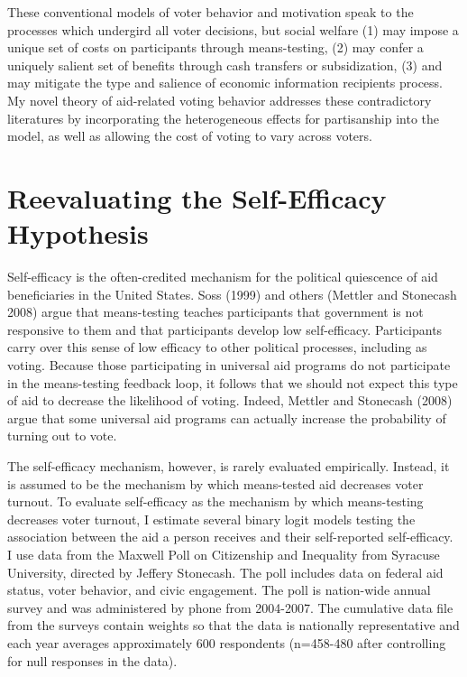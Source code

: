 \documentclass[12pt]{paper}
\begin{document}
These conventional models of voter behavior and motivation speak to the processes which undergird all voter decisions, but social welfare (1) may impose a unique set of costs on participants through means-testing, (2) may confer a uniquely salient set of benefits through cash transfers or subsidization, (3) and may mitigate the type and salience of economic information recipients process. My novel theory of aid-related voting behavior addresses these contradictory literatures by incorporating the heterogeneous effects for partisanship into the model, as well as allowing the cost of voting to vary across voters.

\section{Reevaluating the Self-Efficacy Hypothesis}
Self-efficacy is the often-credited mechanism for the political quiescence of aid beneficiaries in the United States. Soss (1999) and others (Mettler and Stonecash 2008) argue that means-testing teaches participants that government is not responsive to them and that participants develop low self-efficacy. Participants carry over this sense of low efficacy to other political processes, including as voting. Because those participating in universal aid programs do not participate in the means-testing feedback loop, it follows that we should not expect this type of aid to decrease the likelihood of voting. Indeed, Mettler and Stonecash (2008) argue that some universal aid programs can actually increase the probability of turning out to vote. 

The self-efficacy mechanism, however, is rarely evaluated empirically. Instead, it is assumed to be the mechanism by which means-tested aid decreases voter turnout. To evaluate self-efficacy as the mechanism by which means-testing decreases voter turnout, I estimate several binary logit models testing the association between the aid a person receives and their self-reported self-efficacy. I use data from the Maxwell Poll on Citizenship and Inequality from Syracuse University, directed by Jeffery Stonecash. The poll includes data on federal aid status, voter behavior, and civic engagement. The poll is nation-wide annual survey and was administered by phone from 2004-2007. The cumulative data file from the surveys contain weights so that the data is nationally representative and each year averages approximately 600 respondents (n=458-480 after controlling for null responses in the data).
\end{document}
